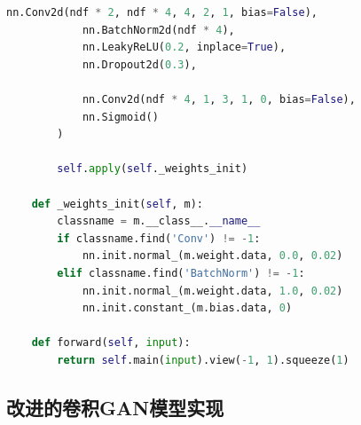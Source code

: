 \documentclass[UTF8]{ctexart}
\begin{document}
\begin{lstlisting}[language=Python, caption=DCGAN生成器和判别器]
            nn.Conv2d(ndf * 2, ndf * 4, 4, 2, 1, bias=False),
            nn.BatchNorm2d(ndf * 4),
            nn.LeakyReLU(0.2, inplace=True),
            nn.Dropout2d(0.3),
            
            nn.Conv2d(ndf * 4, 1, 3, 1, 0, bias=False),
            nn.Sigmoid()
        )
        
        self.apply(self._weights_init)
    
    def _weights_init(self, m):
        classname = m.__class__.__name__
        if classname.find('Conv') != -1:
            nn.init.normal_(m.weight.data, 0.0, 0.02)
        elif classname.find('BatchNorm') != -1:
            nn.init.normal_(m.weight.data, 1.0, 0.02)
            nn.init.constant_(m.bias.data, 0)
    
    def forward(self, input):
        return self.main(input).view(-1, 1).squeeze(1)
\end{lstlisting}

\subsection{改进的卷积GAN模型实现}
\end{document}
